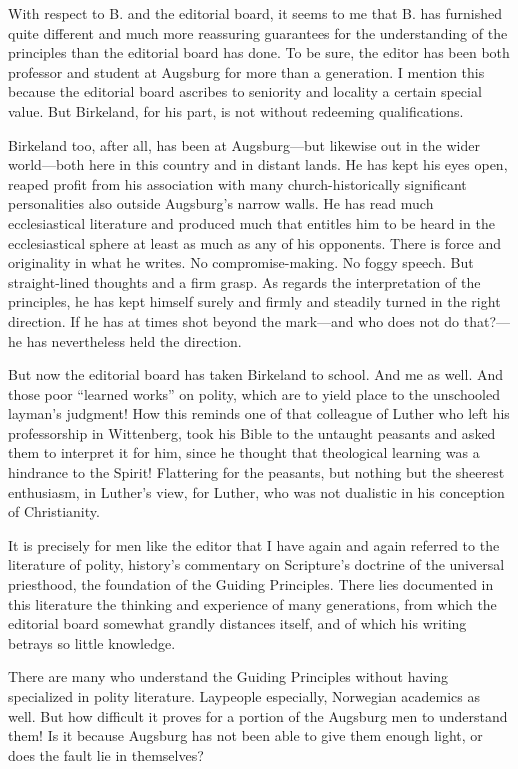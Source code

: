 With respect to B. and the editorial board, it seems to me that B. has furnished quite different and much more reassuring guarantees for the understanding of the principles than the editorial board has done. To be sure, the editor has been both professor and student at Augsburg for more than a generation. I mention this because the editorial board ascribes to seniority and locality a certain special value. But Birkeland, for his part, is not without redeeming qualifications.

Birkeland too, after all, has been at Augsburg—but likewise out in the wider world—both here in this country and in distant lands. He has kept his eyes open, reaped profit from his association with many church-historically significant personalities also outside Augsburg’s narrow walls. He has read much ecclesiastical literature and produced much that entitles him to be heard in the ecclesiastical sphere at least as much as any of his opponents. There is force and originality in what he writes. No compromise-making. No foggy speech. But straight-lined thoughts and a firm grasp. As regards the interpretation of the principles, he has kept himself surely and firmly and steadily turned in the right direction. If he has at times shot beyond the mark—and who does not do that?—he has nevertheless held the direction.

But now the editorial board has taken Birkeland to school. And me as well. And those poor “learned works” on polity, which are to yield place to the unschooled layman’s judgment! How this reminds one of that colleague of Luther who left his professorship in Wittenberg, took his Bible to the untaught peasants and asked them to interpret it for him, since he thought that theological learning was a hindrance to the Spirit! Flattering for the peasants, but nothing but the sheerest enthusiasm, in Luther’s view, for Luther, who was not dualistic in his conception of Christianity.

It is precisely for men like the editor that I have again and again referred to the literature of polity, history’s commentary on Scripture’s doctrine of the universal priesthood, the foundation of the Guiding Principles. There lies documented in this literature the thinking and experience of many generations, from which the editorial board somewhat grandly distances itself, and of which his writing betrays so little knowledge.

There are many who understand the Guiding Principles without having specialized in polity literature. Laypeople especially, Norwegian academics as well. But how difficult it proves for a portion of the Augsburg men to understand them! Is it because Augsburg has not been able to give them enough light, or does the fault lie in themselves?
